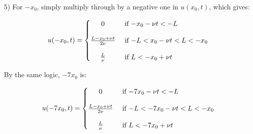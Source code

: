 \documentclass[executivepaper]{article}
\begin{document}
\begin{flushleft}

5) For $-x_{0}$, simply multiply through by a negative one in $u(x_{0},t)$, which gives:

\begin{center}

\[
 u(-x_{0},t)=
  \begin{cases}
      \hfill 0    \hfill & \text{ if $-x_{0}-\nu t < -L$} \\[1em]
      
      \hfill \frac{L-x_{0}+\nu t}{2\nu} \hfill & \text{ if $-L < x_{0}-\nu t < L < -x_{0}$} \\[1em]
      
      \hfill \frac{L}{\nu} \hfill & \text{ if $L < -x_{0}+\nu t$}
  \end{cases}
\]

\end{center}

\pagebreak

\vspace*{-40mm}

By the same logic, $-7x_{0}$ is: 

\begin{center}

\[
 u(-7x_{0},t)=
  \begin{cases}
      \hfill 0    \hfill & \text{ if $-7x_{0}-\nu t < -L$} \\[1em]
      
      \hfill \frac{L-x_{0}+\nu t}{2\nu} \hfill & \text{ if $-L < -7x_{0}-\nu t < L < -x_{0}$} \\[1em]
      
      \hfill \frac{L}{\nu} \hfill & \text{ if $L < -7x_{0}+\nu t$}
  \end{cases}
\]

\end{center}

\end{flushleft}
\end{document}

